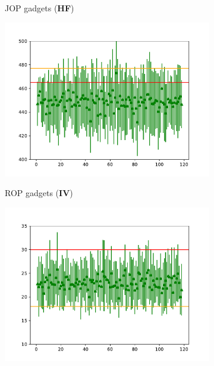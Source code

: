\begin{figure}
\begin{subfigure}[b]{0.4\textwidth}
         \vspace{-0.2in}
         \caption{JOP gadgets (\textbf{HF})}
     \end{subfigure}
     \begin{subfigure}[b]{0.4\textwidth}
         \centering
         \includegraphics[width=\textwidth]{doccam_figures/tree_iv_lr_0001/ROP_gadgets_20_119_sparsed.pdf}
         \label{fig:inst2vec_rop}
         \vspace{-0.2in}
         \caption{ROP gadgets (\textbf{IV})}
       \end{subfigure}
  \begin{subfigure}[b]{0.4\textwidth}
         \centering
         \includegraphics[width=\textwidth]{doccam_figures/tree_iv_lr_0001/JOP_gadgets_15_119_sparsed.pdf}

\end{subfigure}
\end{figure}
